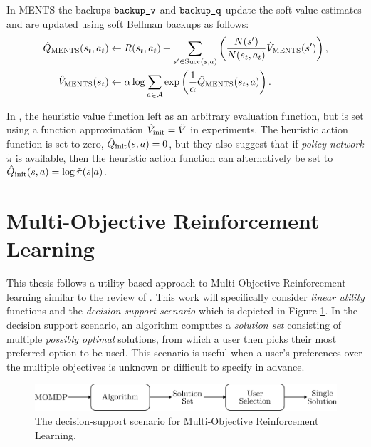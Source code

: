         In MENTS the backups ${\textnormal{\texttt{backup\_v}}}$ and ${\textnormal{\texttt{backup\_q}}}$ update the soft value estimates and are updated using soft Bellman backups as follows:
        \begin{align}
            {\hat{Q}_{{\textnormal{MENTS}}}}(s_t,a_t) &\leftarrow 
                R(s_t,a_t) + \sum_{s'\in{\textnormal{Succ}(s,a)}} \left( \frac{N(s')}{N(s_t,a_t)} {\hat{V}_{{\textnormal{MENTS}}}}(s') \right), \label{eq:ments_backup_q} \\
            {\hat{V}_{{\textnormal{MENTS}}}}(s_t) &\leftarrow 
                \alpha \log \sum_{a\in\mathcal{A}} \exp \left(\frac{1}{\alpha}{\hat{Q}_{{\textnormal{MENTS}}}}(s_t,a) \right). \label{eq:ments_backup_v} 
        \end{align}

        In \cite{ments}, the heuristic value function left as an arbitrary evaluation function, but is set using a function approximation ${\hat{V}_{\textnormal{init}}}=\tilde{V}$ in experiments. The heuristic action function is set to zero, ${\hat{Q}_{\textnormal{init}}}(s,a)=0$, but they also suggest that if \textit{policy network} $\tilde{\pi}$ is available, then the heuristic action function can alternatively be set to ${\hat{Q}_{\textnormal{init}}}(s,a)=\log \tilde{\pi}(s|a)$. 















\section{Multi-Objective Reinforcement Learning}
\label{sec:2-5-morl}

    This thesis follows a utility based approach to Multi-Objective Reinforcement learning similar to the review of \cite{morl_survey} . This work will specifically consider \textit{linear utility} functions and the \textit{decision support scenario} which is depicted in Figure \ref{fig:mo_decision_support}. In the decision support scenario, an algorithm computes a \textit{solution set} consisting of multiple \textit{possibly optimal} solutions, from which a user then picks their most preferred option to be used. This scenario is useful when a user's preferences over the multiple objectives is unknown or difficult to specify in advance. 

    \begin{figure}
        \centering\includegraphics[width=1.0\textwidth]{figures/ch2/decision_support_scenario.pdf} 
        \caption{The decision-support scenario for Multi-Objective Reinforcement Learning. \cite{morl_survey}}
        \label{fig:mo_decision_support}
    \end{figure}

